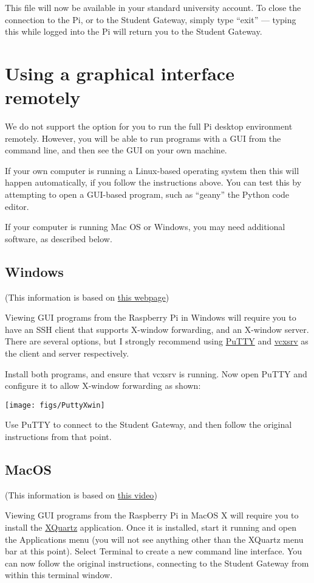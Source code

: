 This file will now be available in your standard university account.
To close the connection to the Pi, or to the Student Gateway, simply type ``exit'' --- typing this while logged into the Pi will return you to the Student Gateway.


\section{Using a graphical interface remotely}

We do not support the option for you to run the full Pi desktop environment remotely.
However, you will be able to run programs with a GUI from the command line, and then see the GUI on your own machine.

If your own computer is running a Linux-based operating system then this will happen automatically, if you follow the instructions above.
You can test this by attempting to open a GUI-based program, such as ``geany'' the Python code editor.

If your computer is running Mac OS or Windows, you may need additional software, as described below.

\subsection{Windows}

(This information is based on \href{https://superuser.com/questions/119792/how-to-use-x11-forwarding-with-putty}{this webpage})

Viewing GUI programs from the Raspberry Pi in Windows will require you to have an SSH client that supports X-window forwarding, and an X-window server.
There are several options, but I strongly recommend using \href{https://www.putty.org/}{PuTTY} and \href{https://sourceforge.net/projects/vcxsrv/}{vcxsrv} as the client and server respectively.

Install both programs, and ensure that vcxsrv is running.
Now open PuTTY and configure it to allow X-window forwarding as shown:
\begin{center}
  \texttt{[image: figs/PuttyXwin]}
\end{center}

Use PuTTY to connect to the Student Gateway, and then follow the original instructions from that point.

\subsection{MacOS}

(This information is based on \href{https://www.youtube.com/watch?v=s6e3cqCISaE}{this video})

Viewing GUI programs from the Raspberry Pi in MacOS X will require you to install the \href{https://www.xquartz.org/}{XQuartz} application.
Once it is installed, start it running and open the Applications menu (you will not see anything other than the XQuartz menu bar at this point).
Select Terminal to create a new command line interface.
You can now follow the original instructions, connecting to the Student Gateway from within this terminal window.
